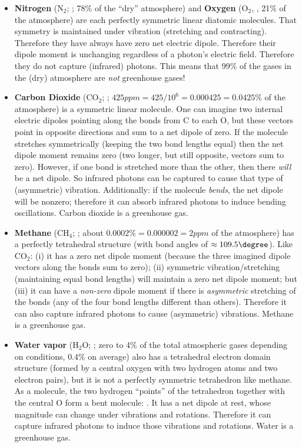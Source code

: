 \documentclass[12pt]{article}
\begin{document}
	\begin{itemize}
	\item {\bf Nitrogen}  ($\text{N}_2$; ; 78\% of the ``dry'' atmosphere) and {\bf Oxygen} ($\text{O}_2$, , 21\% of the atmosphere)  are each perfectly symmetric linear diatomic molecules. That symmetry is maintained under vibration (stretching and contracting). Therefore they have always have zero net electric dipole.  Therefore their dipole moment is unchanging regardless of a photon's electric field. Therefore they do not capture (infrared) photons.  This means that 99\% of the gases in the (dry) atmosphere are {\em not} greenhouse gases!
	\item {\bf Carbon Dioxide} ($\text{C}\text{O}_2$; ; $\unit{425}{ppm} = 425 / 10^6 = 0.000425 = 0.0425 \%$ of the atmosphere) is a symmetric linear molecule.  One can imagine two internal electric dipoles pointing along the bonds from C to each O, but these vectors point in opposite directions and sum to a net dipole of zero.  If the molecule stretches symmetrically (keeping the two bond lengths equal) then the net dipole moment remains zero (two longer, but still opposite, vectors sum to zero). However, if one  bond is stretched more than the other, then there {\em will} be a net dipole.  So infrared photons can be captured to cause that type of (asymmetric) vibration.  Additionally: if the molecule {\em bends}, the net dipole will be nonzero; therefore it can absorb infrared photons to induce bending oscillations.  Carbon dioxide is a greenhouse gas.
	\item {\bf Methane} ($\text{C}\text{H}_4$;  %
	; about $0.0002\% = 0.000002 = \unit{2}{ppm}$ of the atmosphere) has a perfectly tetrahedral structure (with bond angles of $\approx 109.5\degree$). Like $\text{C}\text{O}_2$: (i) it has a zero net dipole moment (because the three imagined dipole vectors along the bonds sum to zero); (ii) symmetric vibration/stretching (maintaining equal bond lengths) will maintain a zero net dipole moment; but (iii) it can have a {\em non-zero} dipole moment if there is {\em asymmetric} stretching of the bonds (any of the four bond lengths different than others). Therefore it can also capture infrared photons to cause (asymmetric) vibrations. Methane is a greenhouse gas.
	\item {\bf Water vapor} ($\text{H}_2\text{O}$; ; zero to 4\% of the total atmospheric gases depending on conditions, $0.4\%$ on average) also has a tetrahedral electron domain structure (formed by a central oxygen with two hydrogen atoms and two electron pairs), but it is not a perfectly symmetric tetrahedron like methane.  As a molecule, the two hydrogen ``points'' of the tetrahedron together with the central O form a bent molecule: .  It has a net dipole at rest, whose magnitude can change under vibrations and rotations.  Therefore it can capture infrared photons to induce those vibrations and rotations. Water is a greenhouse gas.
	\end{itemize}
\end{document}
